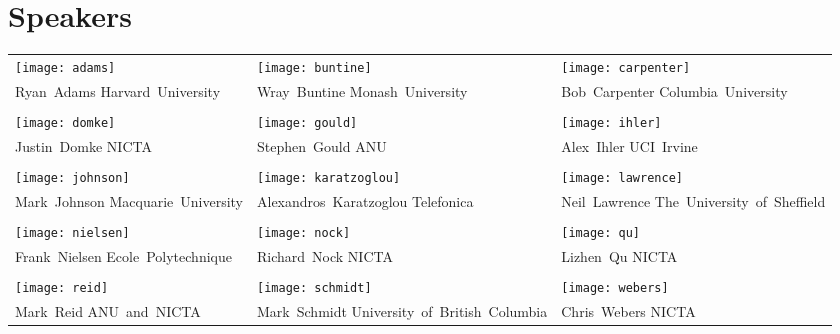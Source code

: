 {}
\section*{Speakers}
\begin{center}
\begin{tabular}{p{6cm} p{6cm} p{6cm}}
\texttt{[image: adams]} 
&
\texttt{[image: buntine]} 
&
\texttt{[image: carpenter]} \\
\mbox{Ryan Adams}  \hspace{3cm}
\mbox{Harvard University} 
&
\mbox{Wray Buntine} \hspace{3cm}
\mbox{Monash University}
&
\mbox{Bob Carpenter} \hspace{3cm}
 \mbox{Columbia University} \\
\\
\texttt{[image: domke]}  
&
\texttt{[image: gould]} 
&
\texttt{[image: ihler]} 
\\
\mbox{Justin Domke} \hspace{3cm}
\mbox{NICTA}
&
\mbox{Stephen Gould} \hspace{3cm} 
\mbox{ANU}
&
\mbox{Alex Ihler} \hspace{3cm} 
\mbox{UCI Irvine}  \\
\\
\texttt{[image: johnson]} 
&
\texttt{[image: karatzoglou]} 
&
\texttt{[image: lawrence]} 
\\
\mbox{Mark Johnson} \hspace{3cm}
\mbox{Macquarie University}
& 
\mbox{Alexandros Karatzoglou} \hspace{3cm}
\mbox{Telefonica}
& 
\mbox{Neil Lawrence} 
\mbox{The University of Sheffield} \\
\\
\texttt{[image: nielsen]} 
&
\texttt{[image: nock]} 
&
\texttt{[image: qu]} 
\\
\mbox{Frank Nielsen} \hspace{3cm}
\mbox{Ecole Polytechnique}
&
\mbox{Richard Nock} \hspace{3cm}
\mbox{NICTA}
&
\mbox{Lizhen Qu} \hspace{3cm}
\mbox{NICTA } \\
\\
\texttt{[image: reid]} 
&
\texttt{[image: schmidt]} 
&
\texttt{[image: webers]}
\\
\mbox{Mark Reid}  \hspace{3cm}
 \mbox{ANU and NICTA}
&
\mbox{Mark Schmidt}
 \mbox{University of British Columbia}
&
\mbox{Chris Webers} \hspace{3cm}
 \mbox{NICTA}
\end{tabular}
\end{center}



